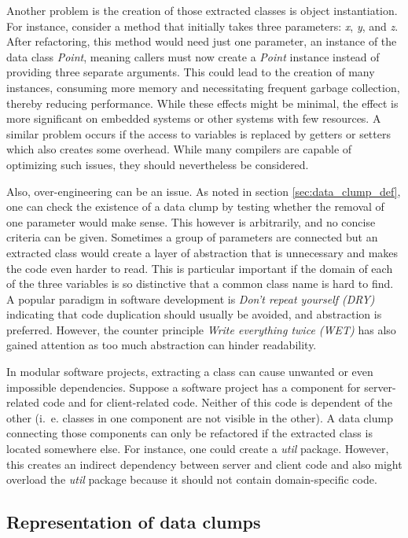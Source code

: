 Another problem is the creation of those extracted classes is object instantiation.  For instance, consider a method that initially takes three parameters: \textit{x}, \textit{y}, and \textit{z}. After refactoring, this method would need just one parameter, an instance of the data class \textit{Point}, meaning callers must now create a \textit{Point} instance instead of providing three separate arguments. This could lead to the creation of many instances, consuming more memory and necessitating frequent garbage collection, thereby reducing performance. While these effects might be minimal, the effect is more significant on embedded systems or other systems with few resources. A similar problem occurs if the access to variables is replaced by getters or setters which also creates some overhead. While many compilers are capable of optimizing such issues, they should nevertheless be considered. 

Also, over-engineering can be an issue. As noted in section \ref{sec:data_clump_def}, one can check the existence of a data clump by testing whether the removal of one parameter would make sense. This however is arbitrarily, and no concise criteria can be given. Sometimes a group of parameters are connected but an extracted class would create a layer of abstraction that is unnecessary and makes the code even harder to read. This is particular important if the domain of each of the three variables is so distinctive that a common class name is hard to find. 
A popular paradigm in software development is \textit{Don't repeat yourself (DRY)} indicating that code duplication should usually be avoided, and abstraction is preferred. However, the counter principle \textit{Write everything twice (WET)} has also gained attention as too much abstraction can hinder readability. \cite{dry}

In modular software projects, extracting a class can cause unwanted or even impossible dependencies.  Suppose a software project has a component for server-related code and for client-related code. Neither of this code is dependent of the other (i.~e. classes in one component are not visible in the other). A data clump connecting those components can only be refactored if the extracted class is located somewhere else. For instance, one could create a \textit{util} package. However, this creates an indirect dependency between server and client code and also might overload the \textit{util} package because it should not contain domain-specific code. 


\subsection{Representation of data clumps}\label{sec:data_clump_graph}

